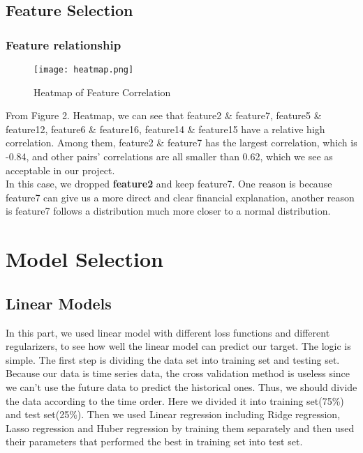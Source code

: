\documentclass[fleqn,10pt]{SelfArx} %
\begin{document}
\subsection{Feature Selection}

\subsubsection*{Feature relationship}

\begin{figure}[ht]\centering %
\texttt{[image: heatmap.png]}
\caption{Heatmap of Feature Correlation}
\label{fig:view}
\end{figure}

From Figure 2. Heatmap, we can see that feature2 \& feature7, feature5 \& feature12, feature6 \& feature16, feature14 \& feature15 have a relative high correlation. Among them, feature2 \& feature7 has the largest correlation, which is -0.84, and other pairs' correlations are all smaller than 0.62, which we see as acceptable in our project. \\
\newline
In this case, we dropped \textbf{feature2} and keep feature7. One reason is because feature7 can give us a more direct and clear financial explanation, another reason is feature7 follows a distribution much more closer to a normal distribution.
\section{Model Selection}
\subsection{Linear Models}
In this part, we used linear model with different loss functions and different regularizers, to see how well the linear model can predict our target. The logic is simple. The first step is dividing the data set into training set and testing set. Because our data is time series data, the cross validation method is useless since we can't use the future data to predict the historical ones. Thus, we should divide the data according to the time order. Here we divided it into training set(75\%) and test set(25\%). Then we used Linear regression including Ridge regression, Lasso regression and Huber regression by training them separately and then used their parameters that performed the best in training set into test set.  \\
\end{document}
